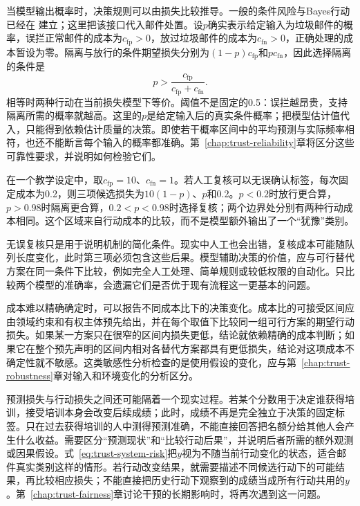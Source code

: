 当模型输出概率时，决策规则可以由损失比较推导。一般的条件风险与Bayes行动已经在
建立；这里把该接口代入邮件处置。设$p$确实表示给定输入为垃圾邮件的概率，误拦正常邮件的成本为$c_{\mathrm{fp}}>0$，放过垃圾邮件的成本为$c_{\mathrm{fn}}>0$，正确处理的成本暂设为零。隔离与放行的条件期望损失分别为$(1-p)c_{\mathrm{fp}}$和$pc_{\mathrm{fn}}$，因此选择隔离的条件是
\begin{equation}
 p>\frac{c_{\mathrm{fp}}}{c_{\mathrm{fp}}+c_{\mathrm{fn}}}.
 \label{eq:trust-cost-threshold}
\end{equation}
相等时两种行动在当前损失模型下等价。阈值不是固定的0.5：误拦越昂贵，支持隔离所需的概率就越高。这里的$p$是给定输入后的真实条件概率；把模型估计值代入，只能得到依赖估计质量的决策。即使若干概率区间中的平均预测与实际频率相符，也还不能断言每个输入的概率都准确。第~\ref{chap:trust-reliability}章将区分这些可靠性要求，并说明如何检验它们。

\begin{example}[增加复核选项后的决策]
\label{ex:trust-review-cost}
在一个教学设定中，取$c_{\mathrm{fp}}=10$、$c_{\mathrm{fn}}=1$。若人工复核可以无误确认标签，每次固定成本为0.2，则三项候选损失为$10(1-p)$、$p$和0.2。$p<0.2$时放行更合算，$p>0.98$时隔离更合算，$0.2<p<0.98$时选择复核；两个边界处分别有两种行动成本相同。这个区域来自行动成本的比较，而不是模型额外输出了一个“犹豫”类别。
\end{example}

无误复核只是用于说明机制的简化条件。现实中人工也会出错，复核成本可能随队列长度变化，此时第三项必须包含这些后果。模型辅助决策的价值，应与可行替代方案在同一条件下比较，例如完全人工处理、简单规则或较低权限的自动化。只比较两个模型的准确率，会遗漏它们是否优于现有流程这一更基本的问题。

成本难以精确确定时，可以报告不同成本比下的决策变化。成本比的可接受区间应由领域约束和有权主体预先给出，并在每个取值下比较同一组可行方案的期望行动损失。如果某一方案只在很窄的区间内损失更低，结论就依赖精确的成本判断；如果它在整个预先声明的区间内相对各替代方案都具有更低损失，结论对这项成本不确定性就不敏感。这类敏感性分析检查的是使用假设的变化，应与第~\ref{chap:trust-robustness}章对输入和环境变化的分析区分。

预测损失与行动损失之间还可能隔着一个现实过程。若某个分数用于决定谁获得培训，接受培训本身会改变后续成绩；此时，成绩不再是完全独立于决策的固定标签。只在过去获得培训的人中测得预测准确，不能直接回答把名额分给其他人会产生什么收益。需要区分“预测现状”和“比较行动后果”，并说明后者所需的额外观测或因果假设。式~\eqref{eq:trust-system-risk}把$y$视为不随当前行动变化的状态，适合邮件真实类别这样的情形。若行动改变结果，就需要描述不同候选行动下的可能结果，再比较相应损失；不能直接把历史行动下观察到的成绩当成所有行动共用的$y$。第~\ref{chap:trust-fairness}章讨论干预的长期影响时，将再次遇到这一问题。

